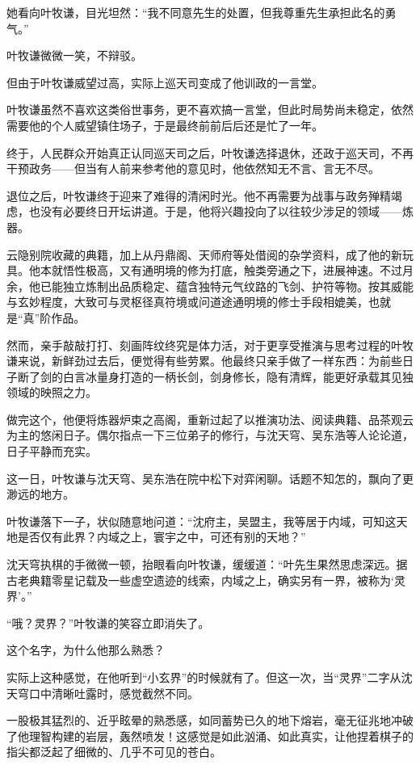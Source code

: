 她看向叶牧谦，目光坦然：“我不同意先生的处置，但我尊重先生承担此名的勇气。”

叶牧谦微微一笑，不辩驳。

\vspace{2em}

但由于叶牧谦威望过高，实际上巡天司变成了他训政的一言堂。

叶牧谦虽然不喜欢这类俗世事务，更不喜欢搞一言堂，但此时局势尚未稳定，依然需要他的个人威望镇住场子，于是最终前前后后还是忙了一年。

终于，人民群众开始真正认同巡天司之后，叶牧谦选择退休，还政于巡天司，不再干预政务——但当有人前来参考他的意见时，他依然知无不言、言无不尽。

\vspace{2em}

退位之后，叶牧谦终于迎来了难得的清闲时光。他不再需要为战事与政务殚精竭虑，也没有必要终日开坛讲道。于是，他将兴趣投向了以往较少涉足的领域——炼器。

云隐别院收藏的典籍，加上从丹鼎阁、天师府等处借阅的杂学资料，成了他的新玩具。他本就悟性极高，又有通明境的修为打底，触类旁通之下，进展神速。不过月余，他已能独立炼制出品质稳定、蕴含独特元气纹路的飞剑、护符等物。按其威能与玄妙程度，大致可与灵枢径真符境或问道途通明境的修士手段相媲美，也就是“真”阶作品。

然而，亲手敲敲打打、刻画阵纹终究是体力活，对于更享受推演与思考过程的叶牧谦来说，新鲜劲过去后，便觉得有些劳累。他最终只亲手做了一样东西：为前些日子断了剑的白言冰量身打造的一柄长剑，剑身修长，隐有清辉，能更好承载其见独领域的映照之力。

做完这个，他便将炼器炉束之高阁，重新过起了以推演功法、阅读典籍、品茶观云为主的悠闲日子。偶尔指点一下三位弟子的修行，与沈天穹、吴东浩等人论论道，日子平静而充实。

这一日，叶牧谦与沈天穹、吴东浩在院中松下对弈闲聊。话题不知怎的，飘向了更渺远的地方。

叶牧谦落下一子，状似随意地问道：“沈府主，吴盟主，我等居于内域，可知这天地是否仅有此界？内域之上，寰宇之中，可还有别的天地？”

沈天穹执棋的手微微一顿，抬眼看向叶牧谦，缓缓道：“叶先生果然思虑深远。据古老典籍零星记载及一些虚空遗迹的线索，内域之上，确实另有一界，被称为‘灵界’。”

“哦？灵界？”叶牧谦的笑容立即消失了。

这个名字，为什么他那么熟悉？

实际上这种感觉，在他听到“小玄界”的时候就有了。但这一次，当“灵界”二字从沈天穹口中清晰吐露时，感觉截然不同。

一股极其猛烈的、近乎眩晕的熟悉感，如同蓄势已久的地下熔岩，毫无征兆地冲破了他理智构建的岩层，轰然喷发！这感觉是如此汹涌、如此真实，让他捏着棋子的指尖都泛起了细微的、几乎不可见的苍白。


